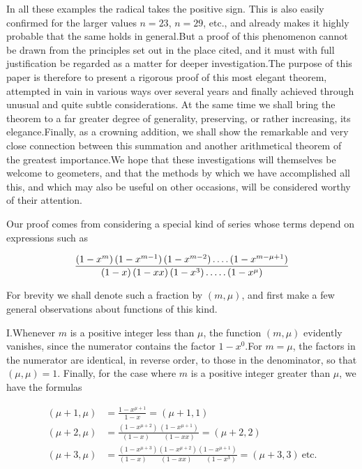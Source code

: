 
In all these examples the radical takes the positive sign. This is also easily confirmed for the larger values $n=23$, $n=29$, etc., and already makes it highly probable that the same holds in general.\quad But a proof of this phenomenon cannot be drawn from the principles set out in the place cited, and it must with full justification be regarded as a matter for deeper investigation.\quad The purpose of this paper is therefore to present a rigorous proof of this most elegant theorem, attempted in vain in various ways over several years and finally achieved through unusual and quite subtle considerations. At the same time we shall bring the theorem to a far greater degree of generality, preserving, or rather increasing, its elegance.\quad Finally, as a crowning addition, we shall show the remarkable and very close connection between this summation and another arithmetical theorem of the greatest importance.\quad We hope that these investigations will themselves be welcome to geometers, and that the methods by which we have accomplished all this, and which may also be useful on other occasions, will be considered worthy of their attention.


Our proof comes from considering a special kind of series whose terms depend on expressions such as

\[
\begin{aligned}
\frac{(1-x^m)\,(1-x^{m-1})\,(1-x^{m-2})\mathinner{.\,.\,.\,.}(1-x^{m-\mu+1})}{(1-x)\,(1-xx)\,(1-x^3)\mathinner{.\,.\,.\,.\,.}(1-x^\mu)}
\end{aligned}
\]

For brevity we shall denote such a fraction by $(m,\mu)$, and first make a few general observations about functions of this kind.

I.\quad Whenever $m$ is a positive integer less than $\mu$, the function $(m,\mu)$ evidently vanishes, since the numerator contains the factor $1-x^0$.\quad For $m=\mu$, the factors in the numerator are identical, in reverse order, to those in the denominator, so that $(\mu,\mu)=1$. Finally, for the case where $m$ is a positive integer greater than $\mu$, we have the formulas

\[
\begin{aligned}
(\mu+1,\mu)&=\frac{1-x^{\mu+1}}{1-x}=(\mu+1,1)\\
(\mu+2,\mu)&=\frac{(1-x^{\mu+2})\,(1-x^{\mu+1})}{(1-x)\qquad(1-xx)}=(\mu+2,2)\\
(\mu+3,\mu)&=\frac{(1-x^{\mu+3})(1-x^{\mu+2})(1-x^{\mu+1})}{(1-x)\qquad(1-xx)\qquad(1-x^3)}=(\mu+3,3)\ \text{etc.}
\end{aligned}
\]

